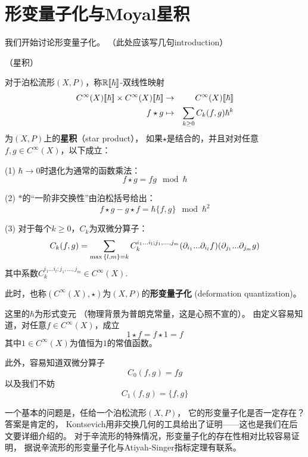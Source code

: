 \section{形变量子化与Moyal星积}
我们开始讨论形变量子化。
{\color{red}（此处应该写几句introduction）}

\begin{definition}（星积）

对于泊松流形$(X,P)$，称$\mathbb{R}[\![\hbar]\!]$-双线性映射
\begin{eqnarray*}
C^{\infty}(X)[\![\hbar]\!]\times C^{\infty}(X)[\![\hbar]\!]
&\to& C^{\infty}(X)[\![\hbar]\!]\\
f\star g&\mapsto& \sum_{k\geq 0}C_k(f,g)\hbar^k
\end{eqnarray*}
为$(X,P)$上的\textbf{星积}（star product），
如果$\star$是结合的，并且对对任意$f,g\in C^{\infty}(X)$，以下成立：


(1) $\hbar\to 0$时退化为通常的函数乘法：
$$f\star g=fg\mod\hbar$$

(2) $*$的“一阶非交换性”由泊松括号给出：
$$f\star g-g\star f=\hbar\{f,g\}\mod\hbar^2$$

(3) 对于每个$k\geq 0$，$C_k$为双微分算子：
$$C_k(f,g)=\sum_{\max{\{l,m\}}=k}
C_k^{i_1...i_l;j_1,...,j_m}(\partial_{i_1}...\partial_{i_l}f)
(\partial_{j_1}...\partial_{j_m}g)$$
其中系数$C_k^{i_1...i_l;j_1,...,j_m}\in C^{\infty}(X)$.
\end{definition}

此时，也称$(C^{\infty}(X),\star)$为$(X,P)$的\textbf{形变量子化}
(deformation quantization)。


这里的$\hbar$为形式变元
（物理背景为普朗克常量，这是心照不宣的）。
由定义容易知道，对任意$f\in C^{\infty}(X)$，成立
$$1\star f=f\star 1=f$$
其中$1\in C^{\infty}(X)$为值恒为$1$的常值函数。

此外，容易知道双微分算子
$$C_0(f,g)=fg$$
以及我们不妨
$$C_1(f,g)=\{f,g\}$$

一个基本的问题是，任给一个泊松流形$(X,P)$，
它的形变量子化是否一定存在？答案是肯定的，
Kontsevich用非交换几何的工具给出了证明——这也是我们在后文要详细介绍的。
对于辛流形的特殊情况，形变量子化的存在性相对比较容易证明，
据说辛流形的形变量子化与Atiyah-Singer指标定理有联系。

